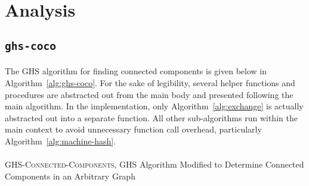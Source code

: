 \documentclass[11pt,epsf]{article}
\begin{document}
\section{Analysis}{
  \subsection{\texttt{ghs-coco}}{
    \paragraph{}{
      The GHS algorithm for finding connected components is given below in Algorithm~\ref{alg:ghs-coco}.
      For the sake of legibility, several helper functions and procedures are abstracted out
      from the main body and presented following the main algorithm. In the implementation,
      only Algorithm~\ref{alg:exchange} is actually abstracted out into a separate function.
      All other sub-algorithms run within the main context to avoid unnecessary function call overhead,
      particularly Algorithm~\ref{alg:machine-hash}.
    }
    \paragraph{}{
      \begin{algorithm}
        \footnotesize
        \caption{\textsc{GHS-Connected-Components}, GHS Algorithm Modified to Determine Connected Components in an Arbitrary Graph}
        \label{alg:ghs-coco}
        \begin{algorithmic}
          \ENDIF


          \ENDFOR


\end{algorithmic}
\end{algorithm}}}}
\end{document}
